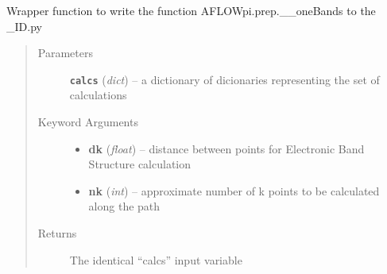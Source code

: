 \documentclass[letterpaper,10pt,english]{sphinxmanual}
\begin{document}

\begin{fulllineitems}
\label{prep:prep.bands}
Wrapper function to write the function AFLOWpi.prep.\_\_oneBands to the \_ID.py
\begin{quote}\begin{description}
\item[{Parameters}] \leavevmode
\textbf{\texttt{calcs}} (\emph{dict}) -- a dictionary of dicionaries representing the set of calculations

\item[{Keyword Arguments}] \leavevmode\begin{itemize}
\item {} 
\textbf{dk} (\emph{float}) --
distance between points for Electronic Band Structure calculation

\item {} 
\textbf{nk} (\emph{int}) --
approximate number of k points to be calculated along the path

\end{itemize}

\item[{Returns}] \leavevmode
The identical ``calcs'' input variable

\end{description}\end{quote}

\end{fulllineitems}

\end{document}
